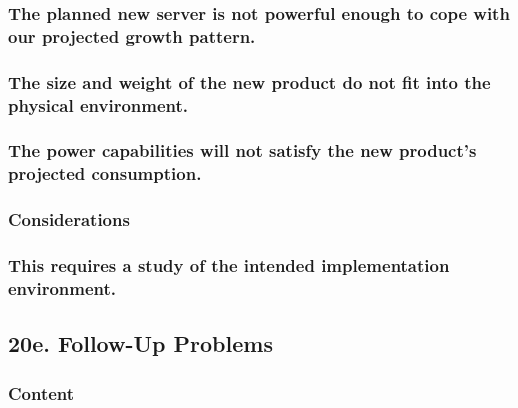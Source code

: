 \documentclass[
]{article}
\begin{document}
\hypertarget{the-planned-new-server-is-not-powerful-enough-to-cope-with-our-projected-growth-pattern.}{%
\subsubsection{The planned new server is not powerful enough to cope
with our projected growth
pattern.}\label{the-planned-new-server-is-not-powerful-enough-to-cope-with-our-projected-growth-pattern.}}

\hypertarget{the-size-and-weight-of-the-new-product-do-not-fit-into-the-physical-environment.}{%
\subsubsection{The size and weight of the new product do not fit into
the physical
environment.}\label{the-size-and-weight-of-the-new-product-do-not-fit-into-the-physical-environment.}}

\hypertarget{the-power-capabilities-will-not-satisfy-the-new-products-projected-consumption.}{%
\subsubsection{The power capabilities will not satisfy the new product's
projected
consumption.}\label{the-power-capabilities-will-not-satisfy-the-new-products-projected-consumption.}}

\hypertarget{considerations-48}{%
\subsubsection{Considerations}\label{considerations-48}}

\hypertarget{this-requires-a-study-of-the-intended-implementation-environment.}{%
\subsubsection{This requires a study of the intended implementation
environment.}\label{this-requires-a-study-of-the-intended-implementation-environment.}}

\hypertarget{e.-follow-up-problems}{%
\subsection{\texorpdfstring{20e. Follow-Up Problems
}{20e. Follow-Up Problems }}\label{e.-follow-up-problems}}

\hypertarget{content-68}{%
\subsubsection{Content}\label{content-68}}
\end{document}
